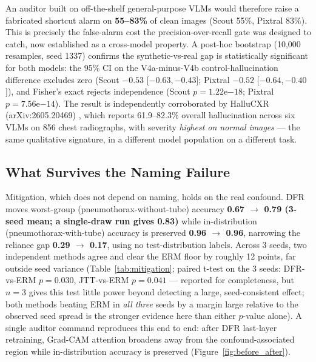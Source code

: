 \documentclass{ieeeaccess}
\begin{document}
An auditor built on off-the-shelf general-purpose VLMs would therefore raise a fabricated shortcut alarm on \textbf{55--83\%} of clean images (Scout 55\%, Pixtral 83\%). This is precisely the false-alarm cost the precision-over-recall gate was designed to catch, now established as a cross-model property. A post-hoc bootstrap (10,000 resamples, seed 1337) confirms the synthetic-vs-real gap is statistically significant for both models: the 95\% CI on the V4a-minus-V4b control-hallucination difference excludes zero (Scout $-0.53$ [$-0.63, -0.43$]; Pixtral $-0.52$ [$-0.64, -0.40$]), and Fisher's exact rejects independence (Scout $p = 1.22\mathrm{e}{-18}$; Pixtral $p = 7.56\mathrm{e}{-14}$). The result is independently corroborated by HalluCXR (arXiv:2605.20469) \cite{hallucxr}, which reports 61.9--82.3\% overall hallucination across six VLMs on 856 chest radiographs, with severity \emph{highest on normal images} --- the same qualitative signature, in a different model population on a different task.

\subsection{What Survives the Naming Failure}
Mitigation, which does not depend on naming, holds on the real confound. DFR moves worst-group (pneumothorax-without-tube) accuracy \textbf{0.67 $\rightarrow$ 0.79 (3-seed mean; a single-draw run gives 0.83)} while in-distribution (pneumothorax-with-tube) accuracy is preserved \textbf{0.96 $\rightarrow$ 0.96}, narrowing the reliance gap \textbf{0.29 $\rightarrow$ 0.17}, using no test-distribution labels. Across 3 seeds, two independent methods agree and clear the ERM floor by roughly 12 points, far outside seed variance (Table~\ref{tab:mitigation}; paired t-test on the 3 seeds: DFR-vs-ERM $p=0.030$, JTT-vs-ERM $p=0.041$ --- reported for completeness, but $n=3$ gives this test little power beyond detecting a large, seed-consistent effect; both methods beating ERM in \emph{all three} seeds by a margin large relative to the observed seed spread is the stronger evidence here than either $p$-value alone). A single auditor command reproduces this end to end: after DFR last-layer retraining, Grad-CAM attention broadens away from the confound-associated region while in-distribution accuracy is preserved (Figure~\ref{fig:before_after}).
\end{document}
